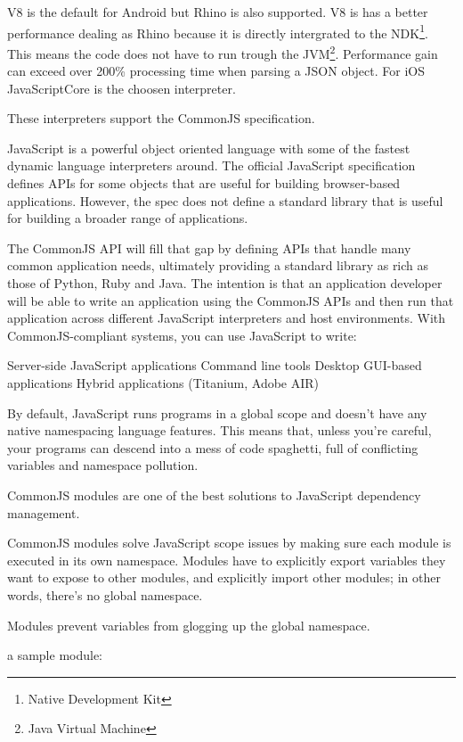 V8 is the default for Android but Rhino is also supported. V8 is has a better performance dealing as Rhino because it is directly intergrated to the NDK\footnote{Native Development Kit}. This means the code does not have to run trough the JVM\footnote{Java Virtual Machine}. Performance gain can exceed over 200\% processing time when parsing a JSON object.\cite{Lukasavage2011}
For iOS JavaScriptCore is the choosen interpreter.

These interpreters support the CommonJS specification.


JavaScript is a powerful object oriented language with some of the fastest dynamic language interpreters around. The official JavaScript specification defines APIs for some objects that are useful for building browser-based applications. However, the spec does not define a standard library that is useful for building a broader range of applications.

The CommonJS API will fill that gap by defining APIs that handle many common application needs, ultimately providing a standard library as rich as those of Python, Ruby and Java. The intention is that an application developer will be able to write an application using the CommonJS APIs and then run that application across different JavaScript interpreters and host environments. With CommonJS-compliant systems, you can use JavaScript to write:

Server-side JavaScript applications
Command line tools
Desktop GUI-based applications
Hybrid applications (Titanium, Adobe AIR)



By default, JavaScript runs programs in a global scope and doesn't have any native namespacing language features. This means that, unless you're careful, your programs can descend into a mess of code spaghetti, full of conflicting variables and namespace pollution.

CommonJS modules are one of the best solutions to JavaScript dependency management.

CommonJS modules solve JavaScript scope issues by making sure each module is executed in its own namespace. Modules have to explicitly export variables they want to expose to other modules, and explicitly import other modules; in other words, there's no global namespace.

Modules prevent variables from glogging up the global namespace.


a sample module:


